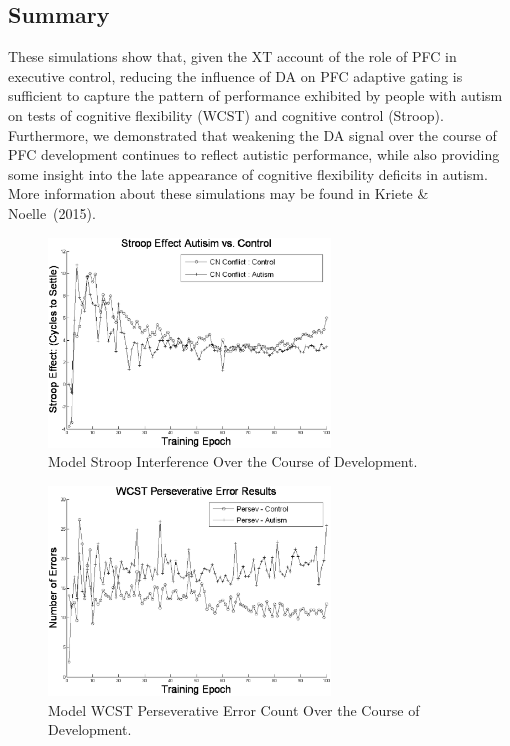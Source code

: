 \subsection{Summary}

These simulations show that, given the XT account of the role of PFC in executive control, reducing the influence of DA on PFC adaptive gating is sufficient to capture the pattern of performance exhibited by people with autism on tests of cognitive flexibility (WCST) and cognitive control (Stroop). Furthermore, we demonstrated that weakening the DA signal over the course of PFC development continues to reflect autistic performance, while also providing some insight into the late appearance of cognitive flexibility deficits in autism. More information about these simulations may be found in Kriete \& Noelle~(2015).\nocite{KrieteT:2015:ED}

\begin{figure}[t]
\begin{center}
	\includegraphics[width=75mm]{graphs/stroop_devel.eps}
\end{center}
\caption{Model Stroop Interference Over the Course of Development.} 
\label{stroop-devel-figure}
\end{figure} 

\begin{figure}[t]
\begin{center}
	\includegraphics[width=75mm]{graphs/wcst_devel_persev.eps}
\end{center}
\caption{Model WCST Perseverative Error Count Over the Course of Development.} 
\label{wcst-devel-figure}
\end{figure} 


